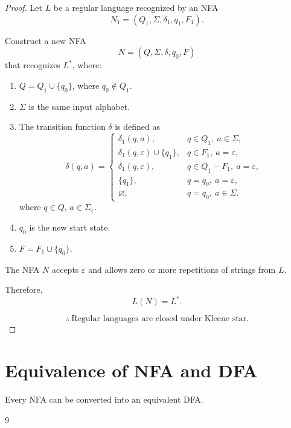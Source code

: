 \documentclass[11pt]{scrreprt}
\begin{document}
\begin{proof}
    Let $L$ be a regular language recognized by an NFA
    \[
        N_1 = (Q_1, \Sigma, \delta_1, q_1, F_1).
    \]

    Construct a new NFA
    \[
        N = (Q, \Sigma, \delta, q_0, F)
    \]
    that recognizes $L^*$, where:

    \begin{enumerate}
        \item $Q = Q_1 \cup \{q_0\}$, where $q_0 \notin Q_1$.

        \item $\Sigma$ is the same input alphabet.

        \item The transition function $\delta$ is defined as
        \[
            \delta(q,a) =
            \begin{cases}
                \delta_1(q,a),
                & q \in Q_1,\ a \in \Sigma,\\[4pt]
                \delta_1(q,\varepsilon) \cup \{q_1\},
                & q \in F_1,\ a = \varepsilon,\\[4pt]
                \delta_1(q,\varepsilon),
                & q \in Q_1 - F_1,\ a = \varepsilon,\\[4pt]
                \{q_1\},
                & q = q_0,\ a = \varepsilon,\\[4pt]
                \varnothing,
                & q = q_0,\ a \in \Sigma.
            \end{cases}
        \]
        where $q \in Q$, $a \in \Sigma_\varepsilon$.

        \item $q_0$ is the new start state.

        \item $F = F_1 \cup \{q_0\}$.
    \end{enumerate}

    The NFA $N$ accepts $\varepsilon$ and allows zero
    or more repetitions of strings from $L$.

    Therefore,
    \[
        L(N) = L^*.
    \]

    \[
        \boxed{
            \therefore\ \text{Regular languages are closed under Kleene star.}
        }
    \]
\end{proof}

\section{Equivalence of NFA and DFA}
\begin{theorem*}
    Every NFA can be converted into an equivalent DFA.
\end{theorem*}9
\end{document}
